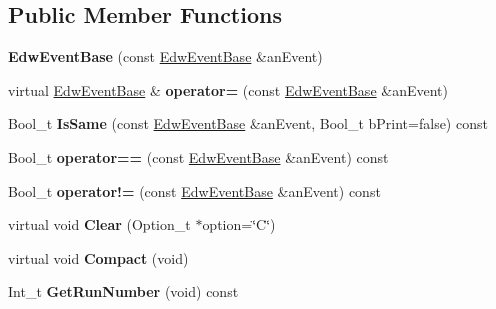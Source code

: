 \subsection*{Public Member Functions}
\begin{DoxyCompactItemize}
\item 
\hypertarget{class_edw_event_base_a30edf241e56d787385d4e21a27c284d2}{
{\bfseries EdwEventBase} (const \hyperlink{class_edw_event_base}{EdwEventBase} \&anEvent)}
\label{class_edw_event_base_a30edf241e56d787385d4e21a27c284d2}

\item 
\hypertarget{class_edw_event_base_a9547fbb384d69443c2edefe55ce501b1}{
virtual \hyperlink{class_edw_event_base}{EdwEventBase} \& {\bfseries operator=} (const \hyperlink{class_edw_event_base}{EdwEventBase} \&anEvent)}
\label{class_edw_event_base_a9547fbb384d69443c2edefe55ce501b1}

\item 
\hypertarget{class_edw_event_base_a8eb9dbc05be1f299a9a66290b5708cd0}{
Bool\_\-t {\bfseries IsSame} (const \hyperlink{class_edw_event_base}{EdwEventBase} \&anEvent, Bool\_\-t bPrint=false) const }
\label{class_edw_event_base_a8eb9dbc05be1f299a9a66290b5708cd0}

\item 
\hypertarget{class_edw_event_base_aafe1889bc7b4585c28b760f22d24239a}{
Bool\_\-t {\bfseries operator==} (const \hyperlink{class_edw_event_base}{EdwEventBase} \&anEvent) const }
\label{class_edw_event_base_aafe1889bc7b4585c28b760f22d24239a}

\item 
\hypertarget{class_edw_event_base_ace5b77fa5046d0dbb75ba290353fb679}{
Bool\_\-t {\bfseries operator!=} (const \hyperlink{class_edw_event_base}{EdwEventBase} \&anEvent) const }
\label{class_edw_event_base_ace5b77fa5046d0dbb75ba290353fb679}

\item 
\hypertarget{class_edw_event_base_a6a17f5298842778e01a84b22d79709fe}{
virtual void {\bfseries Clear} (Option\_\-t $\ast$option=\char`\"{}C\char`\"{})}
\label{class_edw_event_base_a6a17f5298842778e01a84b22d79709fe}

\item 
\hypertarget{class_edw_event_base_afb97a75b23f59bed641f654e810c3e09}{
virtual void {\bfseries Compact} (void)}
\label{class_edw_event_base_afb97a75b23f59bed641f654e810c3e09}

\item 
\hypertarget{class_edw_event_base_af7f24b4639b11be4ff3f6f33eacc56fa}{
Int\_\-t {\bfseries GetRunNumber} (void) const }
\label{class_edw_event_base_af7f24b4639b11be4ff3f6f33eacc56fa}


\end{DoxyCompactItemize}

